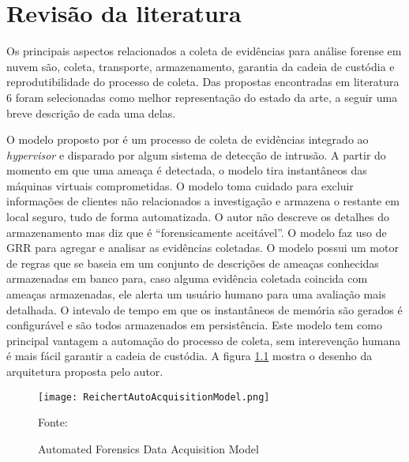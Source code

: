 \chapter{Revisão da literatura}
\label{chp:revisão}


Os principais aspectos relacionados a coleta de evidências para análise forense em nuvem são, coleta, transporte, armazenamento, garantia da cadeia de custódia e reprodutibilidade do processo de coleta. 
%
Das propostas encontradas em literatura 6 foram selecionadas como melhor representação do estado da arte, a seguir uma breve descrição de cada uma delas.

%
O modelo proposto por \cite{ReichertAutoAcquisition:2015} é um processo de coleta de evidências integrado ao \textit{hypervisor} e disparado por algum sistema de detecção de intrusão. 
%
A partir do momento em que uma ameaça é detectada, o modelo tira instantâneos das máquinas virtuais comprometidas. O modelo toma cuidado para excluir informações de clientes não relacionados a investigação e armazena o restante em local seguro, tudo de forma automatizada.
%
O autor não descreve os detalhes do armazenamento mas diz que é ``forensicamente aceitável''.
%
O modelo faz uso de GRR para agregar e analisar as evidências coletadas. 
%
O modelo possui um motor de regras que se baseia em um conjunto de descrições de ameaças conhecidas armazenadas em banco para, caso alguma evidência coletada coincida com ameaças armazenadas, ele alerta um usuário humano para uma avaliação mais detalhada.
%
O intevalo de tempo em que os instantâneos de memória são gerados é configurável e são todos armazenados em persistência.
%
Este modelo tem como principal vantagem a automação do processo de coleta, sem interevenção humana é mais fácil garantir a cadeia de custódia. 
%
A figura \ref{fig:ReichertAutoAcquisitionModel} mostra o desenho da arquitetura proposta pelo autor.

\begin{figure}[htb!]
\footnotesize
\caption{Automated Forensics Data Acquisition Model}
\texttt{[image: ReichertAutoAcquisitionModel.png]}
\centering
\label{fig:ReichertAutoAcquisitionModel}
\begin{center}
Fonte: \cite{ReichertAutoAcquisition:2015} 
\end{center}
\end{figure}

